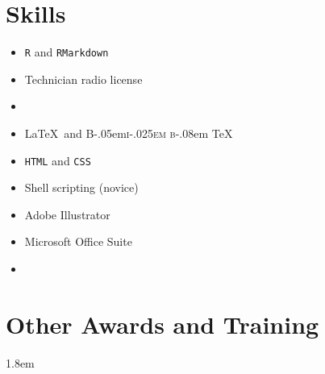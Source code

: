 \documentclass[]{article}
\begin{document}
\newpage
\section{Skills}


\begin{multicols}{3}
\begin{itemize}
	\item[\textcolor{light-gray}{\faRProject}]{\texttt{R} and \texttt{RMarkdown}}
	\item[\textcolor{light-gray}{\faBroadcastTower}]{Technician radio license}
	\item[]{}
\end{itemize}

\columnbreak

\begin{itemize}
	\item[\textcolor{light-gray}{\faFilePdf}]{\LaTeX\ and \DeclareRobustCommand{\BibTeX}{%
  {\normalfont B\kern-.05em{\scshape i\kern-.025em b}\kern-.08em \TeX}%
}\BibTeX}
\item[\textcolor{light-gray}{\faFileCode}]{\texttt{HTML} and \texttt{CSS}}
\item[\textcolor{light-gray}{\faFilePrescription}]{Shell scripting (novice)}
\end{itemize}

\columnbreak

\begin{itemize}
	\item[\textcolor{light-gray}{\faDraftingCompass}]{Adobe Illustrator}
	\item[\textcolor{light-gray}{\faMicrosoft}]{Microsoft Office Suite}
	\item[]{}
\end{itemize}

\end{multicols}

\vspace{2mm}
\section{Other Awards and Training}

\vspace{2mm}
\leftskip 1.8em
\end{document}
